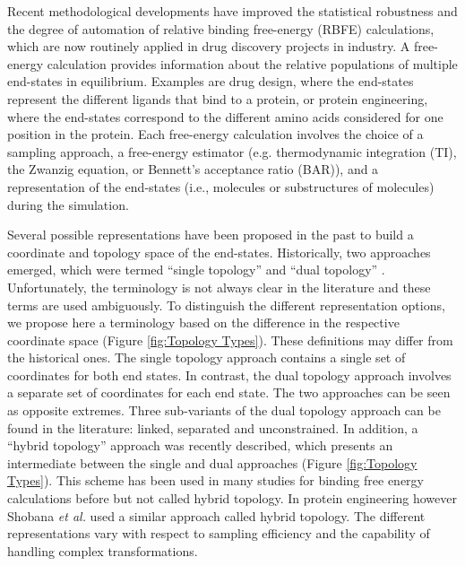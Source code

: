 
Recent methodological developments have improved the statistical robustness and the degree of automation of relative binding free-energy (RBFE) calculations, which are now routinely applied in drug discovery projects in industry. 
\cite{Cournia2017,Cournia2020, Meier2021, Armacost2020c, Barros2022,
       Heinzelmann2021, Gapsys2020, Jespers2019, Raman2020,
       Christ2014, Gao2018, Tielker2021, Loeffler2018}
%
A free-energy calculation provides information about the relative populations of multiple end-states in equilibrium. Examples are drug design, where the end-states represent the different ligands that bind to a protein, \cite{Christ2009, Riniker2011, Wang2015, Wang2017, Aldeghi2016, Sidler2016,Yu2017, Jespers2019,Jiang2019, Paulsen2020} or protein engineering, where the end-states correspond to the different amino acids considered for one position in the protein.\cite{Shobana2000, Bieler2015B, Jespers2019B}
Each free-energy calculation involves the choice of a sampling approach, a free-energy estimator (e.g. thermodynamic integration (TI),\cite{Kirkwood1935} the Zwanzig equation,\cite{Zwanzig1954} or Bennett's acceptance ratio (BAR)\cite{Bennett1976}), and a representation of the end-states (i.e., molecules or substructures of molecules) during the simulation.

Several possible representations have been proposed in the past to build a coordinate and topology space of the end-states. 
Historically, two approaches emerged, which were termed ``single topology'' \cite{Pearlman1991, Pearlman1994} and ``dual topology'' \cite{Pearlman1991, Gao1989}.
Unfortunately, the terminology is not always clear in the literature and these terms are used ambiguously.\cite{Boresch1999, Rocklin2013, Fleck2021}
To distinguish the different representation options, we propose here a terminology based on the difference in the respective coordinate space (Figure \ref{fig:Topology Types}). These definitions may differ from the historical ones. The single topology approach contains a single set of coordinates for both end states. In contrast,  the dual topology approach involves a separate set of coordinates for each end state. The two approaches can be seen as opposite extremes. Three sub-variants of the dual topology approach can be found in the literature: linked, separated and unconstrained.
In addition, a ``hybrid topology'' approach was recently described,\cite{Jiang2019} which presents an intermediate between the single and dual approaches (Figure \ref{fig:Topology Types}). This scheme has been used in many studies for binding free energy calculations before but not called hybrid topology. In protein engineering however Shobana \textit{et al.} used a similar approach called hybrid topology.\cite{Shobana2000} The different representations vary with respect to sampling efficiency and the capability of handling complex transformations.


